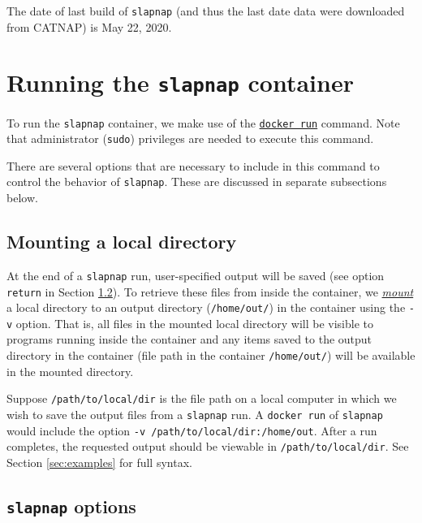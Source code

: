 \documentclass[]{article}
\begin{document}
The date of last build of \texttt{slapnap} (and thus the last date data were downloaded from CATNAP) is May 22, 2020.

\hypertarget{sec:runningcontainer}{%
\section{\texorpdfstring{Running the \texttt{slapnap} container}{Running the slapnap container}}\label{sec:runningcontainer}}

To run the \texttt{slapnap} container, we make use of the \href{https://docs.docker.com/engine/reference/run/}{\texttt{docker\ run}} command. Note that administrator (\texttt{sudo}) privileges are needed to execute this command.

There are several options that are necessary to include in this command to control the behavior of \texttt{slapnap}. These are discussed in separate subsections below.

\hypertarget{sec:mounting}{%
\subsection{Mounting a local directory}\label{sec:mounting}}

At the end of a \texttt{slapnap} run, user-specified output will be saved (see option \texttt{return} in Section \ref{sec:opts}). To retrieve these files from inside the container, we \href{https://docs.docker.com/storage/bind-mounts/}{\emph{mount}} a local directory to an output directory (\texttt{/home/out/}) in the container using the \texttt{-v} option. That is, all files in the mounted local directory will be visible to programs running inside the container and any items saved to the output directory in the container (file path in the container \texttt{/home/out/}) will be available in the mounted directory.

Suppose \texttt{/path/to/local/dir} is the file path on a local computer in which we wish to save the output files from a \texttt{slapnap} run. A \texttt{docker\ run} of \texttt{slapnap} would include the option \texttt{-v\ /path/to/local/dir:/home/out}. After a run completes, the requested output should be viewable in \texttt{/path/to/local/dir}. See Section \ref{sec:examples} for full syntax.

\hypertarget{sec:opts}{%
\subsection{\texorpdfstring{\texttt{slapnap} options}{slapnap options}}\label{sec:opts}}
\end{document}
